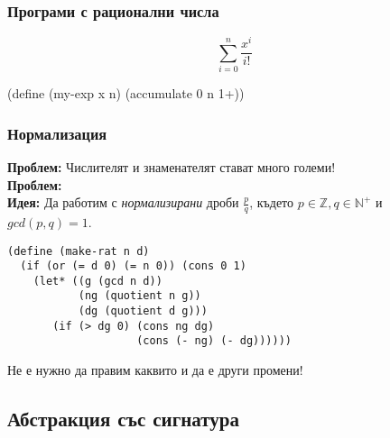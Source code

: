 \documentclass{beamer}
\begin{document}
\begin{frame}[fragile]
  \frametitle{Програми с рационални числа}

  \begin{equation*}
    \sum_{i=0}^n \frac{x^i}{i!}
  \end{equation*}

  \onslide<+->

  \begin{overprint}
\begin{semiverbatim}
(define (my-exp x n)
  (accumulate   0 n
               1+))
\end{semiverbatim}
  \end{overprint}
\end{frame}

\begin{frame}[fragile]
  \frametitle{Нормализация}

  \textbf{Проблем:} Числителят и знаменателят стават много големи!\\[1em]
  \textbf{Проблем:} \\[1em]
  \pause
  \textbf{Идея:} Да работим с \emph{нормализирани} дроби $\frac p q$, където $p \in \mathbb Z, q \in \mathbb N^+$ и $gcd(p,q) = 1$.
  \pause
\begin{verbatim}
(define (make-rat n d)
  (if (or (= d 0) (= n 0)) (cons 0 1)
    (let* ((g (gcd n d))
           (ng (quotient n g))
           (dg (quotient d g)))
       (if (> dg 0) (cons ng dg)
                    (cons (- ng) (- dg))))))
\end{verbatim}
  \pause
  \alert{Не е нужно да правим каквито и да е други промени!}
\end{frame}

\subsection{Абстракция със сигнатура}
\end{document}
